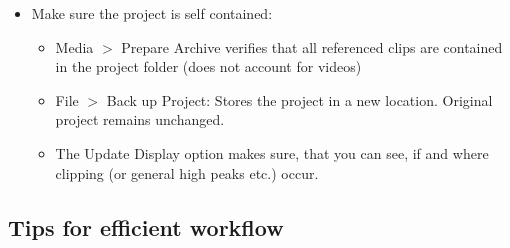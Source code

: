 \documentclass[10pt]{article}
\begin{document}
\begin{itemize}
	\item Make sure the project is self contained:
	\begin{itemize}
		\item Media $>$ Prepare Archive verifies that all referenced clips are contained in the project folder (does not account for videos)
		\item File $>$ Back up Project: Stores the project in a new location. Original project remains unchanged.
		\item The Update Display option makes sure, that you can see, if and where clipping (or general high peaks etc.) occur.
	\end{itemize}
\end{itemize}

\subsection{Tips for efficient workflow}
\end{document}
